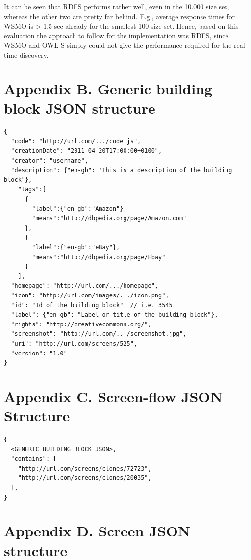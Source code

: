 \documentclass{fast_latex}
\begin{document}
It can be seen that RDFS performs rather well, even in the 10.000 size set, whereas the other two are pretty far behind. E.g., average response times for WSMO is > 1.5 sec already for the smallest 100 size set. Hence, based on this evaluation the approach to follow for the implementation was RDFS, since WSMO and OWL-S simply could not give the performance required for the real-time discovery.


\clearpage
\section*{Appendix B. Generic building block JSON structure}
\label{appendix_b}

\singlespacing
\begin{verbatim}
{
  "code": "http://url.com/.../code.js",
  "creationDate": "2011-04-20T17:00:00+0100",
  "creator": "username",
  "description": {"en-gb": "This is a description of the building block"},
    "tags":[
      {
        "label":{"en-gb":"Amazon"},
        "means":"http://dbpedia.org/page/Amazon.com"
      },
      {
        "label":{"en-gb":"eBay"},
        "means":"http://dbpedia.org/page/Ebay"
      }
    ],
  "homepage": "http://url.com/.../homepage",
  "icon": "http://url.com/images/.../icon.png",
  "id": "Id of the building block", // i.e. 3545
  "label": {"en-gb": "Label or title of the building block"},
  "rights": "http://creativecommons.org/",
  "screenshot": "http://url.com/.../screenshot.jpg",
  "uri": "http://url.com/screens/525",
  "version": "1.0"
}
\end{verbatim}
\doublespacing


\clearpage
\section*{Appendix C. Screen-flow JSON Structure}
\label{appendix_c}

\singlespacing
\begin{verbatim}
{
  <GENERIC BUILDING BLOCK JSON>,
  "contains": [
    "http://url.com/screens/clones/72723",
    "http://url.com/screens/clones/20035",
  ],
}
\end{verbatim}
\doublespacing


\clearpage
\section*{Appendix D. Screen JSON structure}
\label{appendix_d}
\end{document}
